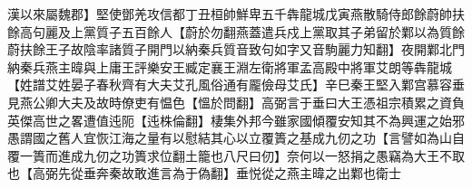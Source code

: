 漢以來屬魏郡】堅使鄧羌攻信都丁丑桓帥鮮卑五千犇龍城戊寅燕散騎侍郎餘蔚帥扶餘高句麗及上黨質子五百餘人【蔚於勿翻燕蓋遣兵戍上黨取其子弟留於鄴以為質餘蔚扶餘王子故陰率諸質子開門以納秦兵質音致句如字又音駒麗力知翻】夜開鄴北門納秦兵燕主暐與上庸王評樂安王臧定襄王淵左衛將軍孟高殿中將軍艾朗等犇龍城【姓譜艾姓晏子春秋齊有大夫艾孔風俗通有龎儉母艾氏】辛巳秦王堅入鄴宫慕容垂見燕公卿大夫及故時僚吏有愠色【慍於問翻】高弼言于垂曰大王憑祖宗積累之資負英傑高世之畧遭值迍阨【迍株倫翻】棲集外邦今雖家國傾覆安知其不為興運之始邪愚謂國之舊人宜恢江海之量有以慰結其心以立覆簣之基成九仞之功【言譬如為山自覆一簣而進成九仞之功簣求位翻土籠也八尺曰仞】奈何以一怒捐之愚竊為大王不取也【高弼先從垂奔秦故敢進言為于偽翻】垂悦從之燕主暐之出鄴也衛士